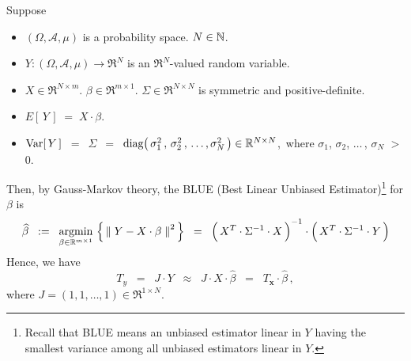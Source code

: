 \clearpage
\begin{remark}
\mbox{}
\vskip 0.15cm
\noindent
Suppose
\begin{itemize}
\item
	$(\Omega,\mathcal{A},\mu)$ is a probability space.
	$N \in \mathbb{N}$.
\item
	$Y : (\Omega,\mathcal{A},\mu) \longrightarrow \Re^{N}$ is an $\Re^{N}$-valued random variable.
\item
	$X \in \Re^{N \times m}$.\;
	$\beta \in \Re^{m \times 1}$.\;
	$\Sigma \in \Re^{N \times N}$ is symmetric and positive-definite.
\item
	$E\!\left[\,Y\,\right] \; = \; X \cdot \beta$.
\item
	$\textnormal{Var}\!\left[\,Y\,\right]$
	\,$=$\, $\Sigma$
	\,$=$\, $\textnormal{diag}\!\left(\,\sigma_{1}^{2}\,,\,\sigma_{2}^{2}\,,\,\ldots,\sigma_{N}^{2}\,\right) \in \mathbb{R}^{N \times N}$,\,
	where $\sigma_{1}$, $\sigma_{2}$, $\ldots$\,, $\sigma_{N}$ $>$ $0$.
\end{itemize}
Then, by Gauss-Markov theory, the
BLUE (Best Linear Unbiased Estimator)\footnote{Recall that BLUE means an unbiased estimator linear in $Y$
having the smallest variance among all unbiased estimators linear in $Y$.} for $\beta$ is
\begin{equation*}
\widehat{\beta}
\;\; := \;\;
	\underset{\beta\in\Re^{m \times 1}}{\textnormal{argmin}}\,
	\left\{\,
		\left\Vert\;Y - X \cdot \beta\;\right\Vert^{2}
	\,\right\}
\;\; = \;\;
	\left(\,X^{T} \overset{{\color{white}!}}{\cdot} \Sigma^{-1} \cdot X\,\right)^{-1}
	\cdot
	\left(\,X^{T} \overset{{\color{white}!}}{\cdot} \Sigma^{-1} \cdot Y \,\right)
\end{equation*}
Hence, we have
\begin{equation}\label{TyEqTxBetaHat}
T_{y}
\;\; = \;\; J \cdot Y
\;\; \approx \;\; J \cdot X \cdot \widehat{\beta}
\;\; = \;\; T_{\mathbf{x}} \cdot \widehat{\beta}\,,
\end{equation}
where $J = (1,1,\ldots,1) \in \Re^{1 \times N}$.


\end{remark}
